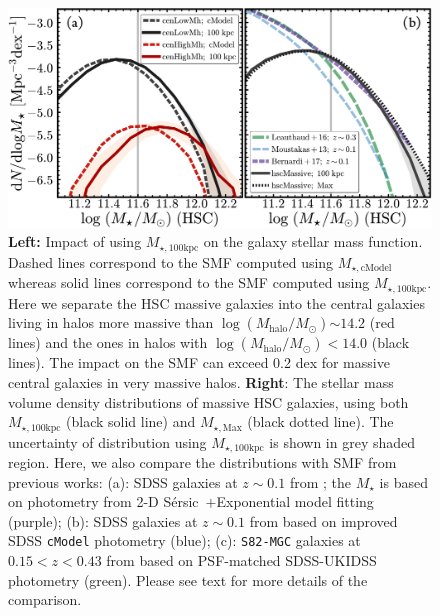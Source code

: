 \documentclass[a4paper,fleqn,usenatbib]{mnras}
\def\ser{{S\'{e}rsic\ }}
\def\mstar{{$M_{\star}$}}
\def\logmh{{$\log (M_{\mathrm{halo}}/M_{\odot})$}}
\def\mtot{{$M_{\star,100\mathrm{kpc}}$}}
\def\mmax{{$M_{\star,\mathrm{Max}}$}}
\def\mcmodel{{$M_{\star,\mathrm{cModel}}$}}
\begin{document}
  \begin{figure}
      \centering 
      \includegraphics[width=\textwidth]{fig/redbcg_mass_smf}
      \caption{
          \textbf{Left:} Impact of using \mtot{} on the galaxy stellar mass function. 
          Dashed lines correspond to the SMF computed using \mcmodel{} whereas solid 
          lines correspond to the SMF computed using \mtot{}. 
          Here we separate the HSC massive galaxies into the central galaxies living 
          in halos more massive than \logmh{}$\sim14.2$ (red lines) and the ones in 
          halos with \logmh{}$<14.0$ (black lines).
          The impact on the SMF can exceed 0.2 dex for massive central galaxies in 
          very massive halos.
          \textbf{Right}: The stellar mass volume density distributions of massive 
          HSC galaxies, using both \mtot{} (black solid line) and \mmax{} (black dotted 
          line). 
          The uncertainty of distribution using \mtot{} is shown in grey shaded 
          region.  
          Here, we also compare the distributions with SMF from previous works: 
          (a): SDSS galaxies at $z{\sim} 0.1$ from \citet{Bernardi2017}; the \mstar{} 
          is based on photometry from 2-D \ser{}$+$Exponential model fitting 
          (purple); 
          (b): SDSS galaxies at $z{\sim} 0.1$ from \citet{Moustakas13} based on 
          improved SDSS \texttt{cModel} photometry (blue); 
          (c): \texttt{S82-MGC} galaxies at $0.15 < z< 0.43$ from 
          \citet{Leauthaud2016} based on PSF-matched SDSS-UKIDSS photometry (green).
          Please see text for more details of the comparison.
          }
      \label{fig:smf}
  \end{figure}
\end{document}
